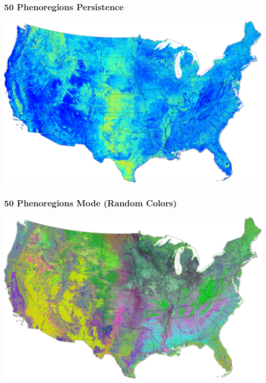 \begin{frame}
 \frametitle{50 Phenoregions Persistence}
 \includegraphics[width=\textwidth]{figures/phendump.2000-2012.50.persistence.large.GIMP.pdf}
\end{frame}

\begin{frame}
 \frametitle{50 Phenoregions Mode (Random Colors)}
 \includegraphics[width=\textwidth]{figures/phendump.2000-2012.50.mode.large.GIMP.pdf}
\end{frame}

